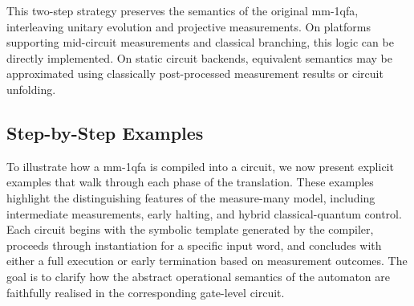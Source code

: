   

This two-step strategy preserves the semantics of the original \gls{mm-1qfa}, interleaving unitary evolution and projective measurements. On platforms supporting mid-circuit measurements and classical branching, this logic can be directly implemented. On static circuit backends, equivalent semantics may be approximated using classically post-processed measurement results or circuit unfolding.
\medskip

\subsection{Step-by-Step Examples}

To illustrate how a \gls{mm-1qfa} is compiled into a circuit, we now present explicit examples that walk through each phase of the translation. These examples highlight the distinguishing features of the measure-many model, including intermediate measurements, early halting, and hybrid classical-quantum control. Each circuit begins with the symbolic template generated by the compiler, proceeds through instantiation for a specific input word, and concludes with either a full execution or early termination based on measurement outcomes. The goal is to clarify how the abstract operational semantics of the automaton are faithfully realised in the corresponding gate-level circuit.


